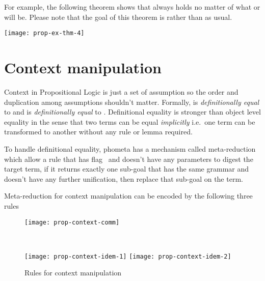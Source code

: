 \documentclass[master.tex]{subfiles}
\begin{document}
For example, the following theorem shows that  always holds
no matter of what  or  will be. Please note that the goal of
this theorem is  rather than  as usual.

\begin{center}
  \texttt{[image: prop-ex-thm-4]}
\end{center}

\section{Context manipulation}

Context in Propositional Logic is just a set of assumption so the order and
duplication among assumptions shouldn't matter. Formally, 
is \emph{definitionally equal} to  and
 is \emph{definitionally equal} to
. Definitional equality is stronger than object level
equality in the sense that two terms can be equal \emph{implicitly} i.e.\
one term can be transformed to another without any rule or lemma required.

To handle definitional equality, phometa has a mechanism called meta-reduction
which allow a rule that has flag \kAllowReduction\ and doesn't have any
parameters to digest the target term, if it returns exactly one sub-goal that
has the same grammar and doesn't have any further unification, then replace that
sub-goal on the term.

Meta-reduction for context manipulation can be encoded by the following three
rules

\begin{figure}[H]
    \centering

\begin{minipage}{0.48\textwidth}
\begin{flushleft}
\texttt{[image: prop-context-comm]}
\end{flushleft}
\end{minipage}
~
\begin{minipage}{0.48\textwidth}
\begin{flushright}
\texttt{[image: prop-context-idem-1]}
\texttt{[image: prop-context-idem-2]}
\end{flushright}
\end{minipage}

\caption{Rules for context manipulation}
\label{fig:prop-context-manipulation}
\end{figure}
\end{document}
